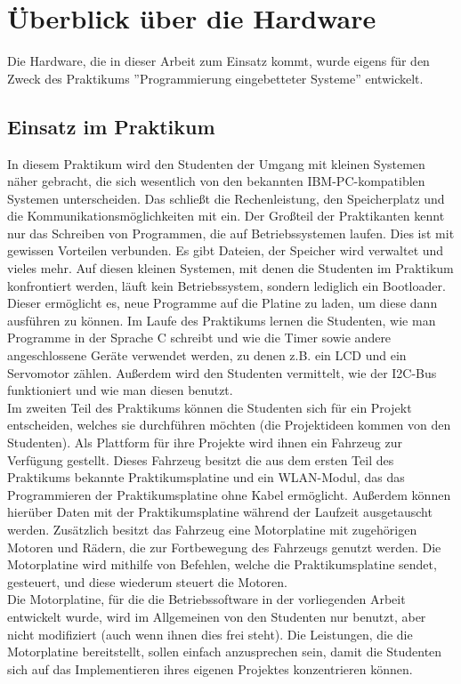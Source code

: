 \chapter{Überblick über die Hardware}
Die Hardware, die in dieser Arbeit zum Einsatz kommt, wurde eigens für den Zweck des Praktikums
''Programmierung eingebetteter Systeme'' entwickelt.

\section{Einsatz im Praktikum}
In diesem Praktikum wird den Studenten der
Umgang mit kleinen Systemen näher gebracht, die sich wesentlich von den bekannten IBM-PC-kompatiblen
Systemen unterscheiden. Das schließt die Rechenleistung, den Speicherplatz und die
Kommunikationsmöglichkeiten mit ein. 
Der Großteil der Praktikanten kennt nur das Schreiben von Programmen, die auf Betriebssystemen laufen.
Dies ist mit gewissen Vorteilen verbunden. Es gibt
Dateien, der Speicher wird verwaltet und vieles mehr. Auf diesen kleinen Systemen, mit denen die Studenten im
Praktikum konfrontiert werden, läuft kein Betriebssystem, sondern lediglich ein Bootloader. Dieser
ermöglicht es, neue Programme auf die Platine zu laden, um diese dann ausführen zu können.
Im Laufe des Praktikums lernen die Studenten, wie man Programme in der Sprache C schreibt und wie die Timer
sowie andere angeschlossene Geräte verwendet werden, zu denen z.B. ein LCD und ein Servomotor zählen.
Außerdem wird den Studenten vermittelt, wie der I2C-Bus funktioniert und wie man diesen benutzt.\\
Im zweiten Teil des Praktikums können die Studenten sich für ein Projekt entscheiden,
welches sie durchführen möchten (die Projektideen kommen von den Studenten).
Als Plattform für ihre Projekte wird ihnen ein Fahrzeug zur Verfügung gestellt. Dieses
Fahrzeug besitzt die aus dem ersten Teil des Praktikums bekannte Praktikumsplatine und ein WLAN-Modul,
das das Programmieren der Praktikumsplatine
ohne Kabel ermöglicht. Außerdem können hierüber Daten mit der Praktikumsplatine während
der Laufzeit ausgetauscht werden. Zusätzlich besitzt das Fahrzeug eine Motorplatine mit
zugehörigen Motoren und Rädern, die zur Fortbewegung des Fahrzeugs genutzt werden. Die
Motorplatine wird mithilfe von Befehlen, welche die Praktikumsplatine sendet, gesteuert, und
diese wiederum steuert die Motoren.\\
Die Motorplatine, für die die Betriebssoftware in der vorliegenden Arbeit entwickelt wurde, wird
im Allgemeinen von den Studenten nur benutzt, aber nicht modifiziert (auch wenn ihnen dies
frei steht). Die Leistungen, die die Motorplatine bereitstellt, 
sollen einfach anzusprechen sein, damit die Studenten sich auf das Implementieren
ihres eigenen Projektes konzentrieren können.\\

